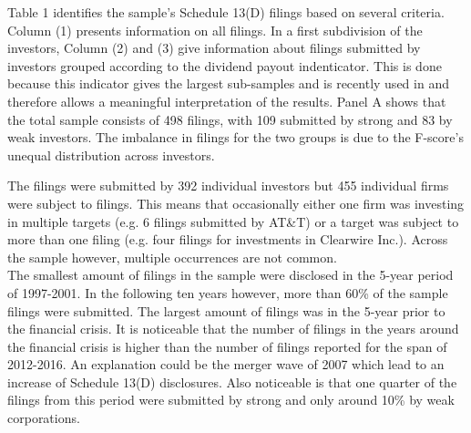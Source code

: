 \documentclass[12pt]{article}
\begin{document}
Table 1 identifies the sample's Schedule 13(D) filings based on several criteria. Column (1) presents information on all filings. In a first subdivision of the investors, Column (2) and (3) give information about filings submitted by investors grouped according to the dividend payout indenticator. This is done because this indicator gives the largest sub-samples and is recently used in \citet[p.109]{Khatami2014} and therefore allows a meaningful interpretation of the results.
Panel A shows that the total sample consists of 498 filings, with 109 submitted by strong and 83 by weak investors. The imbalance in filings for the two groups is due to the F-score's unequal distribution across investors. 

The filings were submitted by 392 individual investors but 455 individual firms were subject to filings. This means that occasionally either one firm was investing in multiple targets (e.g. 6 filings submitted by AT\&T) or a target was subject to more than one filing (e.g. four filings for investments in Clearwire Inc.). Across the sample however, multiple occurrences are not common.\\
The smallest amount of filings in the sample were disclosed in the 5-year period of 1997-2001. In the following ten years however, more than 60\% of the sample filings were submitted. The largest amount of filings was in the 5-year prior to the financial crisis. It is noticeable that the number of filings in the years around the financial crisis is higher than the number of filings reported for the span of 2012-2016. An explanation could be the merger wave of 2007 \citep[p.19]{Huang2017} which lead to an increase of Schedule 13(D) disclosures. Also noticeable is that one quarter of the filings from this period were submitted by strong and only around 10\% by weak corporations.
\end{document}

